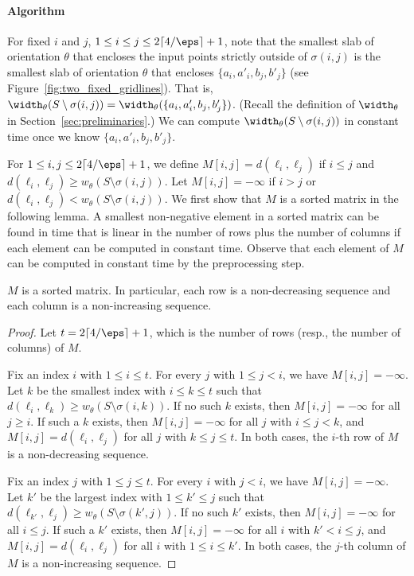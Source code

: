 \paragraph*{Algorithm} 
For fixed $i$ and $j$, $ 1 \le i \le j \le 2\lceil 4/\eps \rceil +1  $, note that the smallest slab of orientation $\theta$ that encloses the input points strictly outside of $\sigma(i, j)$ is the smallest slab of orientation $\theta$ that encloses $\{a_i, a'_i, b_j, b'_j \}$ (see Figure~\ref{fig:two_fixed_gridlines}). 
That is, $\width_\theta(S \setminus \sigma(i, j)) = \width_\theta (\{a_i, a'_i, b_j, b'_j \})$.
(Recall the definition of $\width_\theta$ in Section~\ref{sec:preliminaries}.)
We can compute $\width_\theta(S \setminus \sigma(i, j))$ in constant time once we know $\{a_i, a'_i, b_j, b'_j \}$. 

For  $  1 \le i, j \le 2\lceil 4/\eps \rceil +1$, 
we define $M[i, j] = d(\ell_i, \ell_j)$ if $i\le j$ and 
$d(\ell_i, \ell_j) \ge w_\theta(S \setminus \sigma(i, j))$. 
Let $M[i, j] = -\infty$ if $i>j$ or $d(\ell_i, \ell_j) < w_\theta(S \setminus \sigma(i, j))$. 
We first show that $M$ is a sorted matrix in the following lemma. 
A smallest non-negative element in a sorted matrix can be found in time that is linear in the number of rows plus the number of columns if each element can be computed in constant time.
Observe that each element of $M$ can be computed in constant time by the preprocessing step. 


\begin{lemma}
    $M$ is a sorted matrix. In particular, each row is a non-decreasing sequence and each column is a non-increasing sequence. 
\end{lemma}
\begin{proof}

    Let $t = 2\lceil 4/\eps \rceil + 1$, which is the number of rows (resp., the number of columns) of $M$.

    Fix an index $i$ with $1 \le i \le t$.  
    For every $j$ with $1 \le j < i$, we have $M[i,j] = -\infty$.
    Let $k$ be the smallest index with $i \le k \le t$ such that $d(\ell_i, \ell_k) \ge w_\theta(S \setminus \sigma(i,k))$.  
    If no such $k$ exists, then $M[i,j] = -\infty$ for all $j \ge i$.  
    If such a $k$ exists, then $M[i,j] = -\infty$ for all $j$ with $i \le j < k$, and $M[i,j] = d(\ell_i, \ell_j)$ for all $j$ with $k \le j \le t$.  
    In both cases, the $i$-th row of $M$ is a non-decreasing sequence.
    
    Fix an index $j$ with $1 \le j \le t$.  
    For every $i$ with $j < i$, we have $M[i,j] = -\infty$.
    Let $k'$ be the largest index with $1 \le k' \le j$ such that $d(\ell_{k'}, \ell_j) \ge w_\theta(S \setminus \sigma(k',j))$.  
    If no such $k'$ exists, then $M[i,j] = -\infty$ for all $i \le j$.  
    If such a $k'$ exists, then $M[i,j] = -\infty$ for all $i$ with $k' < i \le j$, and $M[i,j] = d(\ell_i, \ell_j)$ for all $i$ with $1 \le i \le k'$.  
    In both cases, the $j$-th column of $M$ is a non-increasing sequence.
\end{proof}



